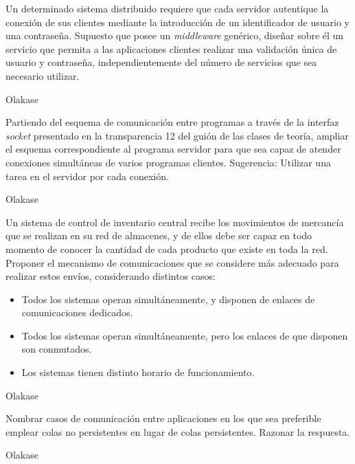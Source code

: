   \begin{problem}
  Un determinado sistema distribuido requiere que cada servidor autentique
  la conexión de sus clientes mediante la introducción de un
  identificador de usuario y una contraseña. Supuesto que posee un
  \textit{middleware} genérico, diseñar sobre él un servicio que permita a las
aplicaciones clientes realizar una validación única de usuario y contraseña,
independientemente del número de servicios que sea necesario utilizar.
  \solution

  Olakase

  \end{problem}

  \begin{problem}
  Partiendo del esquema de comunicación entre programas a través de la
interfaz \textit{socket} presentado en la transparencia 12 del guión de las
clases de teoría, ampliar el esquema correspondiente al programa servidor para
que sea capaz de atender conexiones simultáneas de varios programas clientes.
Sugerencia: Utilizar una tarea en el servidor por cada conexión.
  \solution

  Olakase

  \end{problem}

  \begin{problem}
  Un sistema de control de inventario central recibe los movimientos de
mercancía que se realizan en su red de almacenes, y de ellos debe ser capaz en
todo momento de conocer la cantidad de cada producto que existe en toda la red.
Proponer el mecanismo de comunicaciones que se considere más adecuado para
realizar estos envíos, considerando distintos casos:
  \begin{itemize}
    \item Todos los sistemas operan simultáneamente, y disponen de enlaces de
comunicaciones dedicados.
    \item Todos los sistemas operan simultáneamente, pero los enlaces de que disponen
son conmutados.
    \item Los sistemas tienen distinto horario de funcionamiento.
   \end{itemize}
    \solution

    Olakase

    \end{problem}

  \begin{problem}
  Nombrar casos de comunicación entre aplicaciones en los que sea
preferible emplear colas no persistentes en lugar de colas persistentes.
Razonar la respuesta.
  \solution

  Olakase

  \end{problem}

